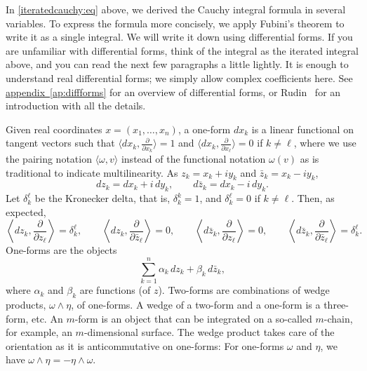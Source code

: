 \documentclass[12pt,openany]{book}
\theoremstyle{plain}
\theoremstyle{remark}
\theoremstyle{definition}
\theoremstyle{exercise}
\theoremstyle{example}
\newcommand{\appendixref}[1]{\hyperref[#1]{appendix~\ref*{#1}}}
\begin{document}
In \eqref{iteratedcauchy:eq} above,
we derived the Cauchy integral formula in several variables.  To
express the formula more concisely, we apply Fubini's theorem to write it as
a single integral.  We will write it down using differential forms.  If you
are unfamiliar with differential forms, think of the integral
as the iterated integral above, and you can read the next few paragraphs
a little lightly.
It is enough to understand real differential forms; we simply allow
complex coefficients here.
See \appendixref{ap:diffforms} for an overview of differential forms,
or
Rudin~\cite{Rudin:principles} for an introduction with all the details.

Given real coordinates $x = (x_1,\ldots,x_n)$, a one-form $d x_k$ is a linear functional on tangent vectors
such that $\bigl\langle d x_k , \frac{\partial}{\partial x_k} \bigr\rangle = 1$ and
$\bigl\langle d x_k , \frac{\partial}{\partial x_{\ell}} \bigr\rangle = 0$ if
$k \neq {\ell}$,
where we use the pairing notation
%
$\langle \omega , v \rangle$ instead of the functional notation
$\omega(v)$ as is traditional to indicate multilinearity.
As $z_k = x_k + i y_k$ and
$\bar{z}_k = x_k - i y_k$,
%
\begin{equation*}
d z_k = d x_k + i \, d y_k ,
\qquad
d \bar{z}_k = d x_k - i \, d y_k .
\end{equation*}
Let
%
$\delta_{k}^{\ell}$ be the Kronecker delta, that is, $\delta_k^k = 1$,
and $\delta_k^{\ell} = 0$ if $k \neq {\ell}$.  Then, as expected,
\begin{equation*}
\left\langle
d z_k , \frac{\partial}{\partial z_{\ell}} \right\rangle =
\delta_k^{\ell} ,
\qquad
\left\langle
d z_k , \frac{\partial}{\partial \bar{z}_{\ell}} \right\rangle = 0 ,
\qquad
\left\langle
d \bar{z}_k , \frac{\partial}{\partial z_{\ell}} \right\rangle = 0 ,
\qquad
\left\langle
d \bar{z}_k , \frac{\partial}{\partial \bar{z}_{\ell}} \right\rangle =
\delta_k^{\ell}
.
\end{equation*}
One-forms are the objects
\begin{equation*}
\sum_{k=1}^n \alpha_k \, d z_k +
\beta_k \, d \bar{z}_k ,
\end{equation*}
where $\alpha_k$ and $\beta_k$ are functions (of $z$).
Two-forms are combinations of wedge products,
$\omega \wedge \eta$, of one-forms.  A wedge of a two-form and
a one-form is a three-form, etc.
An $m$-form is an object that
can be integrated on a so-called $m$-chain, for example, an
$m$-dimensional surface.  The wedge product takes care of the orientation
as it is anticommutative on one-forms:
For one-forms $\omega$ and $\eta$, we have
$\omega \wedge \eta = - \eta \wedge \omega$.
\end{document}
